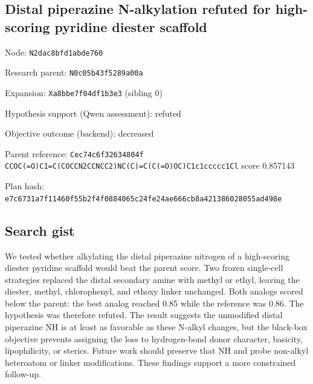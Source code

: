 \begingroup
\fontsize{10.5}{12}\selectfont
{}
\setlength{\parskip}{4pt}
\titlespacing*{\subsection}{0pt}{6pt}{2pt}
\subsection*{Distal piperazine N-alkylation refuted for high-scoring pyridine diester scaffold}

{\small\setlength{\parskip}{0pt}
{Node: \nolinkurl{N2dac8bfd1abde760}\par}
{Research parent: \nolinkurl{N0c05b43f5289a00a}\par}
{Expansion: \nolinkurl{Xa8bbe7f04df1b3e3} (sibling 0)\par}
{Hypothesis support (Qwen assessment): refuted\par}
{Objective outcome (backend): decreased\par}
{Parent reference: \nolinkurl{Cec74c6f32634804f} \nolinkurl{CCOC(=O)C1=C(COCCN2CCNCC2)NC(C)=C(C(=O)OC)C1c1ccccc1Cl} score 0.857143\par}
{Plan hash: \nolinkurl{e7c6731a7f11460f55b2f4f0884065c24fe24ae666cb8a421386028055ad498e}\par}

}
\subsection*{Search gist}
We tested whether alkylating the distal piperazine nitrogen of a high-scoring diester pyridine scaffold would beat the parent score. Two frozen single-cell strategies replaced the distal secondary amine with methyl or ethyl, leaving the diester, methyl, chlorophenyl, and ethoxy linker unchanged. Both analogs scored below the parent: the best analog reached 0.85 while the reference was 0.86. The hypothesis was therefore refuted. The result suggests the unmodified distal piperazine NH is at least as favorable as these N-alkyl changes, but the black-box objective prevents assigning the loss to hydrogen-bond donor character, basicity, lipophilicity, or sterics. Future work should preserve that NH and probe non-alkyl heteroatom or linker modifications. These findings support a more constrained follow-up.

